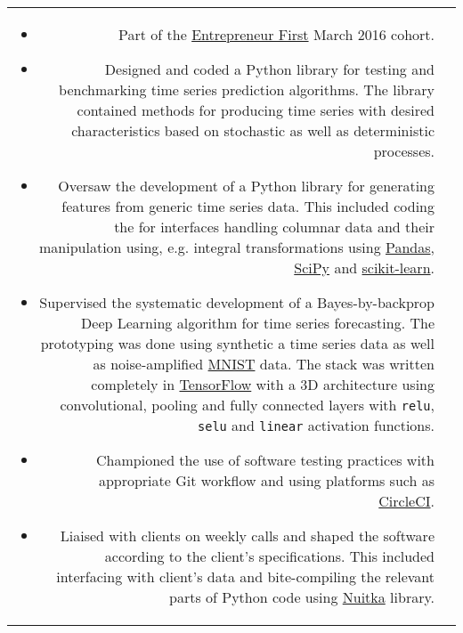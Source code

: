\documentclass[a4paper,10pt]{article}
\begin{document}
\begin{tabular}{r|p{11cm}}
{\begin{itemize}
  \item Part of the \href{https://www.joinef.com/}{Entrepreneur First} March 2016 cohort.
  \item Designed and coded a Python library for testing and benchmarking time series prediction algorithms.
  The library contained methods for producing time series with desired characteristics based on stochastic as well as
  deterministic processes.
  \item Oversaw the development of a Python library for generating features from generic time series data.
  This included coding the for interfaces handling columnar data and their manipulation using, e.g.
  integral transformations using \href{https://pandas.pydata.org/}{Pandas}, \href{https://www.scipy.org/}{SciPy}
  and \href{http://scikit-learn.org/stable/}{scikit-learn}.
  \item Supervised the systematic development of a Bayes-by-backprop Deep Learning algorithm for time
  series forecasting. The prototyping was done using synthetic a time series data as well as noise-amplified
  \href{http://yann.lecun.com/exdb/mnist/}{MNIST} data. The stack was written completely in
  \href{https://www.tensorflow.org/}{TensorFlow} with a 3D architecture using convolutional,
  pooling and fully connected layers with \texttt{relu}, \texttt{selu} and \texttt{linear} activation functions.
  \item Championed the use of software testing practices with appropriate Git workflow and using platforms such
  as \href{https://circleci.com/}{CircleCI}.
  \item Liaised with clients on weekly calls and shaped the software according to the client's specifications.
  This included interfacing with client's data and bite-compiling the relevant parts of Python code using
  \href{http://nuitka.net/}{Nuitka} library.


\end{itemize}}
\end{tabular}
\end{document}
